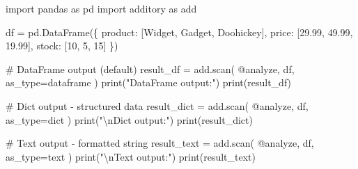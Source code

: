 \documentclass[
  letterpaper,
]{scrbook}
\newenvironment{Shaded}{\begin{snugshade}}{\end{snugshade}}
\newcommand{\BuiltInTok}[1]{\textcolor[rgb]{0.00,0.23,0.31}{#1}}
\newcommand{\CharTok}[1]{\textcolor[rgb]{0.13,0.47,0.30}{#1}}
\newcommand{\CommentTok}[1]{\textcolor[rgb]{0.37,0.37,0.37}{#1}}
\newcommand{\DecValTok}[1]{\textcolor[rgb]{0.68,0.00,0.00}{#1}}
\newcommand{\FloatTok}[1]{\textcolor[rgb]{0.68,0.00,0.00}{#1}}
\newcommand{\ImportTok}[1]{\textcolor[rgb]{0.00,0.46,0.62}{#1}}
\newcommand{\NormalTok}[1]{\textcolor[rgb]{0.00,0.23,0.31}{#1}}
\newcommand{\OperatorTok}[1]{\textcolor[rgb]{0.37,0.37,0.37}{#1}}
\newcommand{\StringTok}[1]{\textcolor[rgb]{0.13,0.47,0.30}{#1}}
\begin{document}
\begin{Shaded}
\begin{Highlighting}[]
\ImportTok{import}\NormalTok{ pandas }\ImportTok{as}\NormalTok{ pd}
\ImportTok{import}\NormalTok{ additory }\ImportTok{as}\NormalTok{ add}

\NormalTok{df }\OperatorTok{=}\NormalTok{ pd.DataFrame(\{}
    \StringTok{\textquotesingle{}product\textquotesingle{}}\NormalTok{: [}\StringTok{\textquotesingle{}Widget\textquotesingle{}}\NormalTok{, }\StringTok{\textquotesingle{}Gadget\textquotesingle{}}\NormalTok{, }\StringTok{\textquotesingle{}Doohickey\textquotesingle{}}\NormalTok{],}
    \StringTok{\textquotesingle{}price\textquotesingle{}}\NormalTok{: [}\FloatTok{29.99}\NormalTok{, }\FloatTok{49.99}\NormalTok{, }\FloatTok{19.99}\NormalTok{],}
    \StringTok{\textquotesingle{}stock\textquotesingle{}}\NormalTok{: [}\DecValTok{10}\NormalTok{, }\DecValTok{5}\NormalTok{, }\DecValTok{15}\NormalTok{]}
\NormalTok{\})}

\CommentTok{\# DataFrame output (default)}
\NormalTok{result\_df }\OperatorTok{=}\NormalTok{ add.scan(}
    \StringTok{\textquotesingle{}@analyze\textquotesingle{}}\NormalTok{,}
\NormalTok{    df,}
\NormalTok{    as\_type}\OperatorTok{=}\StringTok{\textquotesingle{}dataframe\textquotesingle{}}
\NormalTok{)}
\BuiltInTok{print}\NormalTok{(}\StringTok{"DataFrame output:"}\NormalTok{)}
\BuiltInTok{print}\NormalTok{(result\_df)}

\CommentTok{\# Dict output {-} structured data}
\NormalTok{result\_dict }\OperatorTok{=}\NormalTok{ add.scan(}
    \StringTok{\textquotesingle{}@analyze\textquotesingle{}}\NormalTok{,}
\NormalTok{    df,}
\NormalTok{    as\_type}\OperatorTok{=}\StringTok{\textquotesingle{}dict\textquotesingle{}}
\NormalTok{)}
\BuiltInTok{print}\NormalTok{(}\StringTok{"}\CharTok{\textbackslash{}n}\StringTok{Dict output:"}\NormalTok{)}
\BuiltInTok{print}\NormalTok{(result\_dict)}

\CommentTok{\# Text output {-} formatted string}
\NormalTok{result\_text }\OperatorTok{=}\NormalTok{ add.scan(}
    \StringTok{\textquotesingle{}@analyze\textquotesingle{}}\NormalTok{,}
\NormalTok{    df,}
\NormalTok{    as\_type}\OperatorTok{=}\StringTok{\textquotesingle{}text\textquotesingle{}}
\NormalTok{)}
\BuiltInTok{print}\NormalTok{(}\StringTok{"}\CharTok{\textbackslash{}n}\StringTok{Text output:"}\NormalTok{)}
\BuiltInTok{print}\NormalTok{(result\_text)}
\end{Highlighting}
\end{Shaded}
\end{document}
